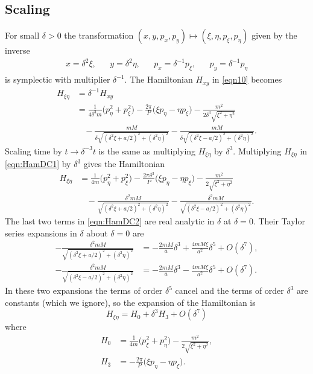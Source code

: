 \documentclass[12pt]{article}
\begin{document}
\subsection{Scaling}
For small $\delta > 0$ the transformation $(x,y,p_x,p_y) \mapsto (\xi,\eta,p_\xi,p_\eta)$ given by the inverse
\begin{align}
x = \delta^2\xi, & & y = \delta^2\eta, & & p_x = \delta^{-1}p_\xi, & & p_y = \delta^{-1}p_\eta
\label{eqn:scalingdoublecollision}
\end{align}
is symplectic with multiplier $\delta^{-1}$. The Hamiltonian $H_{xy}$ in \eqref{eqn10} becomes
\begin{equation}
\begin{aligned}
H_{\xi\eta}
& = \delta^{-1} H_{xy}  \\
& = \frac{1}{4\delta^3 m}\big( p_\eta^2 + p_\xi^2\big) - \frac{2\pi}{P}\big(\xi p_\eta - \eta p_\xi\big) - \frac{m^2}{ 2\delta^3 \sqrt { \xi^2 + \eta^2}}  \\
&  \ \ \ \  -\frac{ m M}{\delta \sqrt { (\delta^2\xi + a/2)^2 + (\delta^2\eta)^2}} - \frac{mM}{ \delta \sqrt{ (\delta^2 \xi - a/2)^2 + (\delta^2 \eta)^2}}.
\label{eqn:HamDC1}
\end{aligned}
\end{equation}
Scaling time by $t\to \delta^{-3}t$ is the same as multiplying $H_{\xi\eta}$ by $\delta^3$. Multiplying $H_{\xi\eta}$ in \eqref{eqn:HamDC1} by $\delta^3$ gives the Hamiltonian
\begin{equation}
\begin{aligned} 
H_{\xi\eta}
& =  \frac{1}{4m}\big( p_\eta^2 + p_\xi^2\big) - \frac{2\pi\delta^3}{P}\big(\xi p_\eta - \eta p_\xi\big) - \frac{m^2}{ 2 \sqrt { \xi^2 + \eta^2}} \\
&  \ \ \ \  - \frac{\delta^2 m M}{ \sqrt { (\delta^2\xi + a/2)^2 + (\delta^2\eta)^2}} - \frac{\delta^2 mM}{\sqrt{ (\delta^2 \xi - a/2)^2 + (\delta^2 \eta)^2}}.
\label{eqn:HamDC2}
\end{aligned}
\end{equation}
The last two terms in \eqref{eqn:HamDC2} are real analytic in $\delta$ at $\delta=0$. Their Taylor series expansions in $\delta$ about $\delta = 0$ are
\begin{align*}
-\frac{\delta^2 m M}{ \sqrt { (\delta^2\xi + a/2)^2 + (\delta^2\eta)^2}}
& = - \frac{2mM}{a} \delta^3 + \frac{ 4mM\xi}{ a^2} \delta^5 + O(\delta^7), \\
- \frac{\delta^2 mM}{\sqrt{ (\delta^2 \xi - a/2)^2 + (\delta^2 \eta)^2}}
& = - \frac{2mM}{a} \delta^3 - \frac{ 4mM\xi }{ a^2} \delta^5 + O(\delta^7).
\end{align*}
In these two expansions the terms of order $\delta^5$ cancel and the terms of order $\delta^3$ are constants (which we ignore), so the expansion of the Hamiltonian is
\[ H_{\xi\eta} = H_0 + \delta^3 H_3 + O(\delta^7)\]
where
\begin{align*}
H_0 & = \frac{1}{4m}\big( p_\xi^2 + p_\eta^2\big) - \frac{m^2}{2\sqrt{\xi^2 + \eta^2}}, \\
H_3 & = -\frac{2\pi}{P}\big( \xi p_\eta - \eta p_\xi\big).
\end{align*}
\end{document}
